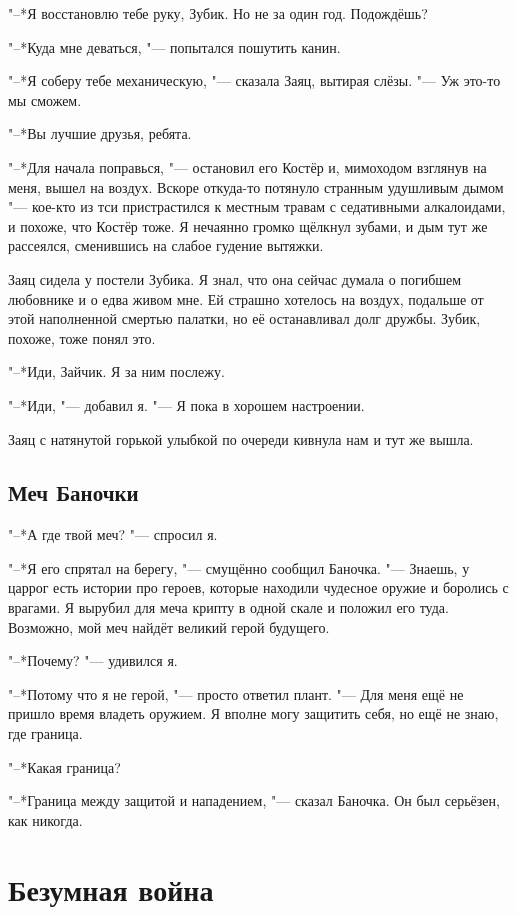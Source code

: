 \documentclass[a4paper,10pt]{book}
\begin{document}
"--*Я восстановлю тебе руку, Зубик. Но не за один год. Подождёшь?

"--*Куда мне деваться, "--- попытался пошутить канин.

"--*Я соберу тебе механическую, "--- сказала Заяц, вытирая слёзы. "--- Уж 
это-то 
мы сможем.

"--*Вы лучшие друзья, ребята.

"--*Для начала поправься, "--- остановил его Костёр и, мимоходом взглянув на 
меня, вышел на воздух. Вскоре откуда-то потянуло странным удушливым дымом "--- 
кое-кто из тси пристрастился к местным травам с седативными алкалоидами, и 
похоже, что Костёр тоже. Я нечаянно громко щёлкнул зубами, и дым тут же 
рассеялся, сменившись на слабое гудение вытяжки.

Заяц сидела у постели Зубика. Я знал, что она сейчас думала о погибшем 
любовнике и о едва живом мне. Ей страшно хотелось на воздух, подальше от этой 
наполненной смертью палатки, но её останавливал долг дружбы. Зубик, похоже, 
тоже понял это.

"--*Иди, Зайчик. Я за ним послежу.

"--*Иди, "--- добавил я. "--- Я пока в хорошем настроении.

Заяц с натянутой горькой улыбкой по очереди кивнула нам и тут же вышла.

 
\section{Меч Баночки}

"--*А где твой меч? "--- спросил я.

"--*Я его спрятал на берегу, "--- смущённо сообщил Баночка. "--- Знаешь, у 
царрог есть истории про героев, которые находили чудесное оружие и боролись с 
врагами. Я вырубил для меча крипту в одной скале и положил его туда. Возможно, 
мой меч найдёт великий герой будущего.

"--*Почему? "--- удивился я.

"--*Потому что я не герой, "--- просто ответил плант. "--- Для меня ещё не 
пришло время владеть оружием. Я вполне могу защитить себя, но ещё не знаю, где 
граница.

"--*Какая граница?

"--*Граница между защитой и нападением, "--- сказал Баночка. Он был серьёзен, 
как никогда.

\chapter{Безумная война}
 
\end{document}
